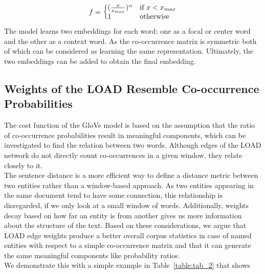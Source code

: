 \begin{equation}
f=\left\{
  \begin{array}{@{}ll@{}}
    (\frac { x }{ { x }_{ max } } )^{ \alpha  }& \text{if}\ x<x_{max} \\
    1 & \text{otherwise}
  \end{array}\right.
\label{eq:weighingfunction}
\end{equation}
\noindent
The model learns two embeddings for each word: one as a focal or center word and the other as a context word. As the co-occurrence matrix is symmetric both of which can be considered as learning the same representation. Ultimately, the two embeddings can be added to obtain the final embedding.

\subsection{Weights of the LOAD Resemble Co-occurrence Probabilities}\label{subsec:weights_load}
The cost function of the GloVe model is based on the assumption that the ratio of co-occurrence probabilities result in meaningful components, which can be investigated to find the relation between two words. Although edges of the LOAD network do not directly count co-occurrences in a given window, they relate closely to it. \\
The sentence distance is a more efficient way to define a distance metric between two entities rather than a window-based approach. As two entities appearing in the same document tend to have some connection, this relationship is disregarded, if we only look at a small window of words. Additionally, weights decay based on how far an entity is from another gives us more information about the structure of the text. Based on these considerations, we argue that LOAD edge weights produce a better overall corpus statistics in case of named entities with respect to a simple co-occurrence matrix and that it can generate the same meaningful components like probability ratios. \\
We demonstrate this with a simple example in Table~\ref{table:tab_2} that shows
